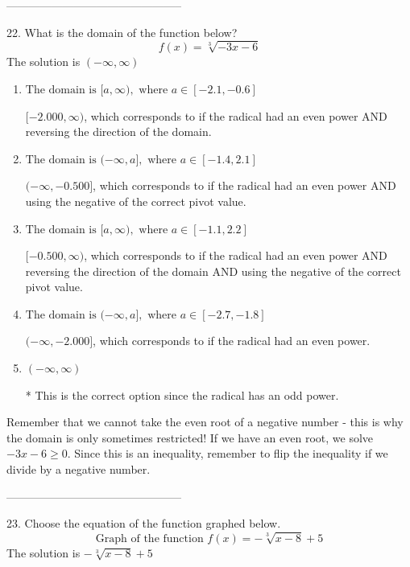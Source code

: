 \documentclass{extbook}[14pt]
\begin{document}
-----------------------------------------------

22. What is the domain of the function below?
\[ f(x) = \sqrt[3]{-3 x - 6} \] 
The solution is $ (-\infty, \infty) $ 

\begin{enumerate}[label=\Alph*.] 
\item $ \text{The domain is } [a, \infty), \text{   where } a \in [-2.1, -0.6] $ 

 $[-2.000, \infty)$, which corresponds to if the radical had an even power AND reversing the direction of the domain. 
\item $ \text{The domain is } (-\infty, a], \text{   where } a \in [-1.4, 2.1] $ 

 $(-\infty, -0.500]$, which corresponds to if the radical had an even power AND using the negative of the correct pivot value. 
\item $ \text{The domain is } [a, \infty), \text{   where } a \in [-1.1, 2.2] $ 

 $[-0.500, \infty)$, which corresponds to if the radical had an even power AND reversing the direction of the domain AND using the negative of the correct pivot value. 
\item $ \text{The domain is } (-\infty, a], \text{   where } a \in [-2.7, -1.8] $ 

 $(-\infty, -2.000]$, which corresponds to if the radical had an even power. 
\item $ (-\infty, \infty) $ 

 * This is the correct option since the radical has an odd power. 
\end{enumerate} 
 
Remember that we cannot take the even root of a negative number - this is why the domain is only sometimes restricted! If we have an even root, we solve $-3 x - 6 \geq 0$. Since this is an inequality, remember to flip the inequality if we divide by a negative number.

-----------------------------------------------

23. Choose the equation of the function graphed below.
\[ \text{Graph of the function } f(x) = - \sqrt[3]{x - 8} + 5 \] 
The solution is $ - \sqrt[3]{x - 8} + 5 $ 
\end{document}

